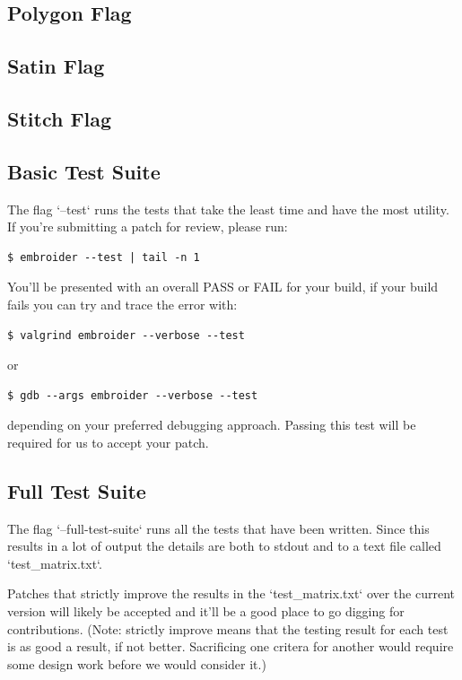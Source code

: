 \documentclass[10pt]{report}
\begin{document}
\subsection{Polygon Flag}

\subsection{Satin Flag}

\subsection{Stitch Flag}

\subsection{Basic Test Suite}

The flag `--test` runs the tests that take the least time and have the most utility. If you're submitting a patch for review, please run:

\begin{lstlisting}
$ embroider --test | tail -n 1
\end{lstlisting}

You'll be presented with an overall PASS or FAIL for your build,
if your build fails you can try and trace the error with:

\begin{lstlisting}
$ valgrind embroider --verbose --test
\end{lstlisting}

or

\begin{lstlisting}
$ gdb --args embroider --verbose --test
\end{lstlisting}

depending on your preferred debugging approach. Passing this test
will be required for us to accept your patch.

\subsection{Full Test Suite}

The flag `--full-test-suite` runs all the tests that have been written.
Since this results in a lot of output the details are both to stdout
and to a text file called `test\_matrix.txt`.

Patches that strictly improve the results in the `test\_matrix.txt` over
the current version will likely be accepted and it'll be a good place
to go digging for contributions. (Note: strictly improve means that
the testing result for each test is as good a result, if not better.
Sacrificing one critera for another would require some design work
before we would consider it.)
\end{document}
